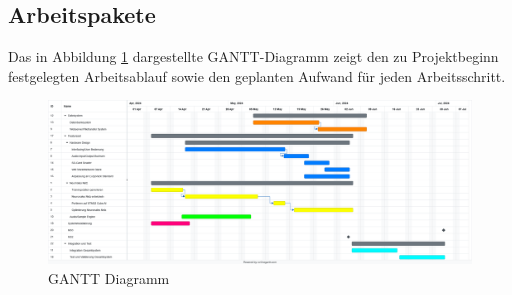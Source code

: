 \subsection{Arbeitspakete}
Das in Abbildung \ref{fig:gantt} dargestellte GANTT-Diagramm zeigt den zu Projektbeginn festgelegten Arbeitsablauf sowie den geplanten Aufwand für jeden Arbeitsschritt.

\begin{figure}[H]
	\centering
	\includegraphics[width=1.0\textwidth]{images/04_spezifikation/gantt.png}
	\caption{GANTT Diagramm}
	\label{fig:gantt}
\end{figure}

